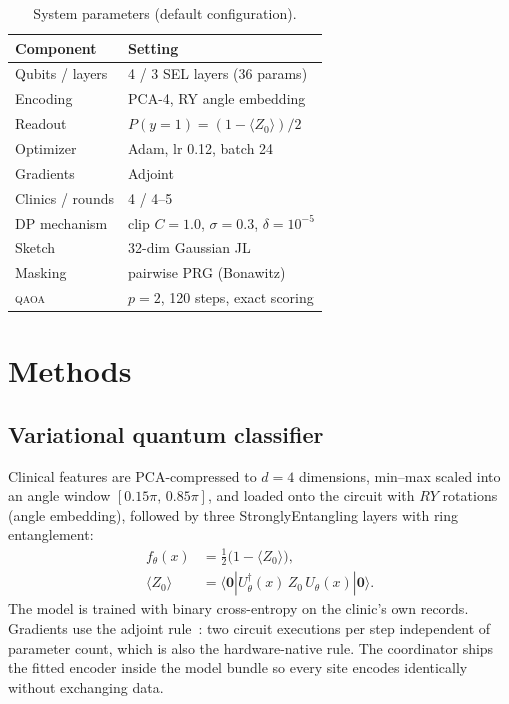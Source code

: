 \documentclass[conference]{IEEEtran}
\newcommand{\qaoa}{\textsc{qaoa}}
\begin{document}
\begin{table}[t]
\centering
\caption{System parameters (default configuration).}
\label{tab:params}
\small
\begin{tabular*}{\columnwidth}{@{\extracolsep{\fill}} ll}
\toprule
Component & Setting \\
\midrule
Qubits / layers & 4 / 3 SEL layers (36 params) \\
Encoding & PCA-4, RY angle embedding \\
Readout & $P(y{=}1)=(1{-}\langle Z_0\rangle)/2$ \\
Optimizer & Adam, lr 0.12, batch 24 \\
Gradients & Adjoint~\cite{jones} \\
Clinics / rounds & 4 / 4--5 \\
DP mechanism & clip $C{=}1.0$, $\sigma{=}0.3$, $\delta{=}10^{-5}$ \\
Sketch & 32-dim Gaussian JL \\
Masking & pairwise PRG (Bonawitz) \\
\qaoa{} & $p{=}2$, 120 steps, exact scoring \\
\bottomrule
\end{tabular*}
\end{table}

\section{Methods}\label{sec:methods}

\subsection{Variational quantum classifier}
Clinical features are PCA-compressed to $d{=}4$ dimensions, min--max scaled
into an angle window $[0.15\pi,\,0.85\pi]$, and loaded onto the circuit with
$RY$ rotations (angle embedding), followed by three StronglyEntangling layers
with ring entanglement:
\begin{align}
f_\theta(x) &= \tfrac{1}{2}\bigl(1-\langle Z_0\rangle\bigr), \label{eq:readout}\\
\langle Z_0\rangle &= \langle \mathbf{0} | U_\theta^\dagger(x)\, Z_0\, U_\theta(x) | \mathbf{0} \rangle. \nonumber
\end{align}
The model is trained with binary cross-entropy on the clinic's own records.
Gradients use the adjoint rule~\cite{jones}: two circuit executions per step
independent of parameter count, which is also the hardware-native rule. The
coordinator ships the fitted encoder inside the model bundle so every site
encodes identically without exchanging data.
\end{document}
